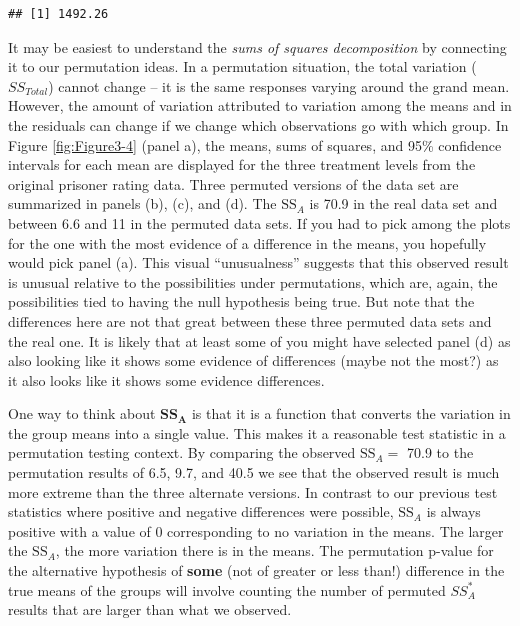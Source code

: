\documentclass[]{book}
\theoremstyle{definition}
\theoremstyle{definition}
\theoremstyle{remark}
\begin{document}
\begin{verbatim}
## [1] 1492.26
\end{verbatim}

It may be easiest to understand the \emph{sums of squares decomposition}
by connecting it to our permutation ideas. In a permutation situation,
the total variation (\(SS_{Total}\)) cannot change -- it is the same
responses varying around the grand mean. However, the amount of
variation attributed to variation among the means and in the residuals
can change if we change which observations go with which group. In
Figure \ref{fig:Figure3-4} (panel a), the means, sums of squares, and
95\% confidence intervals for each mean are displayed for the three
treatment levels from the original prisoner rating data. Three permuted
versions of the data set are summarized in panels (b), (c), and (d). The
\(\text{SS}_A\) is 70.9 in the real data set and between 6.6 and 11 in
the permuted data sets. If you had to pick among the plots for the one
with the most evidence of a difference in the means, you hopefully would
pick panel (a). This visual ``unusualness'' suggests that this observed
result is unusual relative to the possibilities under permutations,
which are, again, the possibilities tied to having the null hypothesis
being true. But note that the differences here are not that great
between these three permuted data sets and the real one. It is likely
that at least some of you might have selected panel (d) as also looking
like it shows some evidence of differences (maybe not the most?) as it
also looks like it shows some evidence differences.

One way to think about \(\textbf{SS}_\textbf{A}\) is that it is a
function that converts the variation in the group means into a single
value. This makes it a reasonable test statistic in a permutation
testing context. By comparing the observed \(\text{SS}_A =\) 70.9 to the
permutation results of 6.5, 9.7, and 40.5 we see that the observed
result is much more extreme than the three alternate versions. In
contrast to our previous test statistics where positive and negative
differences were possible, \(\text{SS}_A\) is always positive with a
value of 0 corresponding to no variation in the means. The larger the
\(\text{SS}_A\), the more variation there is in the means. The
permutation p-value for the alternative hypothesis of \textbf{some} (not
of greater or less than!) difference in the true means of the groups
will involve counting the number of permuted \(SS_A^*\) results that are
larger than what we observed.
\end{document}
